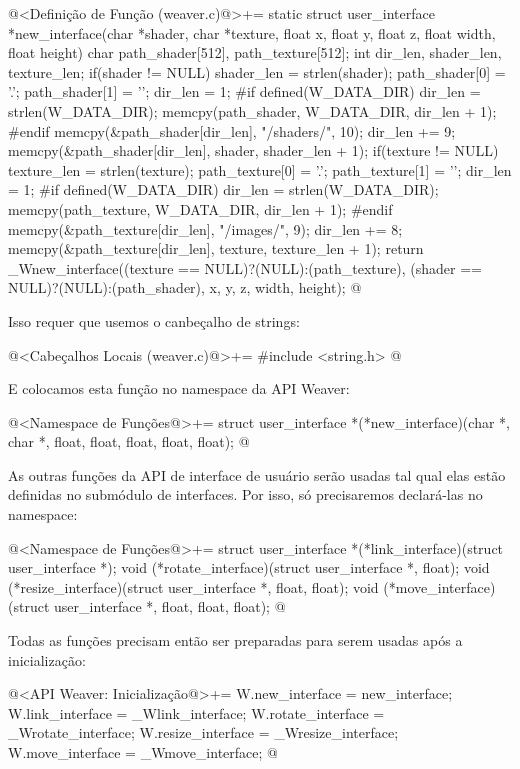 \iniciocodigo
@<Definição de Função (weaver.c)@>+=
static struct user_interface *new_interface(char *shader, char *texture,
                                            float x, float y, float z,
                                            float width, float height){
  char path_shader[512], path_texture[512];
  int dir_len, shader_len, texture_len;
  if(shader != NULL){
    shader_len = strlen(shader);
    path_shader[0] = '.';
    path_shader[1] = '\0';
    dir_len = 1;
#if defined(W_DATA_DIR)
    dir_len = strlen(W_DATA_DIR);
    memcpy(path_shader, W_DATA_DIR, dir_len + 1);
#endif
    memcpy(&path_shader[dir_len], "/shaders/", 10);
    dir_len += 9;
    memcpy(&path_shader[dir_len], shader, shader_len + 1);
  }
  if(texture != NULL){
    texture_len = strlen(texture);
    path_texture[0] = '.';
    path_texture[1] = '\0';
    dir_len = 1;
#if defined(W_DATA_DIR)
    dir_len = strlen(W_DATA_DIR);
    memcpy(path_texture, W_DATA_DIR, dir_len + 1);
#endif
    memcpy(&path_texture[dir_len], "/images/", 9);
    dir_len += 8;
    memcpy(&path_texture[dir_len], texture, texture_len + 1);
  }  
  return _Wnew_interface((texture == NULL)?(NULL):(path_texture),
                         (shader == NULL)?(NULL):(path_shader),
                         x, y, z, width, height);
}
@
\fimcodigo

Isso requer que usemos o canbeçalho de strings:

\iniciocodigo
@<Cabeçalhos Locais (weaver.c)@>+=
#include <string.h>
@
\fimcodigo

E colocamos esta função no namespace da API Weaver:

\iniciocodigo
@<Namespace de Funções@>+=
struct user_interface *(*new_interface)(char *, char *, float, float,
                                        float, float, float);
@
\fimcodigo

As outras funções da API de interface de usuário serão usadas tal qual
elas estão definidas no submódulo de interfaces. Por isso, só
precisaremos declará-las no namespace:

\iniciocodigo
@<Namespace de Funções@>+=
struct user_interface *(*link_interface)(struct user_interface *);
void (*rotate_interface)(struct user_interface *, float);
void (*resize_interface)(struct user_interface *, float, float);
void (*move_interface)(struct user_interface *, float, float, float);
@
\fimcodigo

Todas as funções precisam então ser preparadas para serem usadas após
a inicialização:

\iniciocodigo
@<API Weaver: Inicialização@>+=
W.new_interface = new_interface;
W.link_interface = _Wlink_interface;
W.rotate_interface = _Wrotate_interface;
W.resize_interface = _Wresize_interface;
W.move_interface = _Wmove_interface;
@
\fimcodigo


